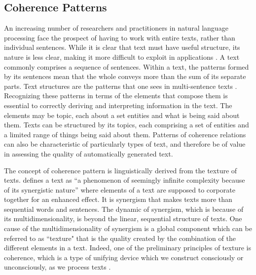 \subsection{Coherence Patterns}

An increasing number of researchers and practitioners in natural language processing face the prospect of having to work with entire texts, rather than individual sentences. 
While it is clear that text must have useful structure, its nature is less clear, making it more difficult to exploit in applications \cite{webber12a}. 
A text commonly comprises a sequence of sentences. 
Within a text, the patterns formed by its sentences mean that the whole conveys more than the sum of its separate parts. 
Text structures are the patterns that one sees in multi-sentence texts \cite{webber12a}. 
Recognizing these patterns in terms of the elements that compose them is essential to correctly deriving and interpreting information in the text. 
The elements may be topic, each  about a set entities and what is being said about them.
Texts can be structured by its topics, each comprising a set of entities and a limited range of things being said about them. 
Patterns of coherence relations can also be characteristic of particularly types of text, and therefore be of value in assessing the quality of automatically generated text. 

The concept of coherence pattern is linguistically derived from the texture of texts. 
 defines a text as ``a phenomenon of seemingly infinite complexity because of its synergistic nature'' where elements of a text are supposed to corporate together for an enhanced effect. 
It is synergism that makes texts more than sequential words and sentences. 
The dynamic of synergism, which is because of its multidimensionality, is beyond the linear, sequential structure of texts. 
One cause of the multidimensionality of synergism is a global component which can be referred to as ``texture" that is 
the quality created by the combination of the different elements in a text. 
Indeed, one of the preliminary principles of texture is coherence, which is a type of unifying device which we construct consciously or unconsciously, as we process texts \cite{stoddard91,halliday76}.

